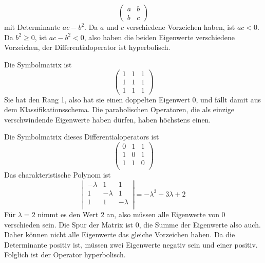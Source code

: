 \begin{loesung}
\begin{teilaufgaben}
\[
\begin{pmatrix}a&b\\b&c\end{pmatrix}
\]
mit Determinante $ac-b^2$. Da $a$ und $c$ verschiedene Vorzeichen
haben, ist $ac< 0$. Da $b^2\ge 0$, ist $ac-b^2<0$, also haben
die beiden Eigenwerte verschiedene Vorzeichen, der Differentialoperator
ist hyperbolisch.
\item Die Symbolmatrix ist
\[
\begin{pmatrix}1&1&1\\1&1&1\\1&1&1\end{pmatrix}
\]
Sie hat den Rang 1, also hat sie einen doppelten Eigenwert $0$,
und fällt damit aus dem Klassifikationsschema. Die parabolischen
Operatoren, die als einzige verschwindende Eigenwerte haben dürfen,
haben höchstens einen.
\item Die Symbolmatrix dieses Differentialoperators ist
\[
\begin{pmatrix}
0&1&1\\
1&0&1\\
1&1&0\\
\end{pmatrix}
\]
Das charakteristische Polynom ist
\[
\left|\,
\begin{matrix}
-\lambda&1&1\\
1&-\lambda&1\\
1&1&-\lambda\\
\end{matrix}
\,\right|
=-\lambda^3+3\lambda+2
\]
Für $\lambda=2$ nimmt es den Wert $2$ an, also müssen alle Eigenwerte
von $0$ verschieden sein. Die Spur der Matrix ist $0$, die Summe der
Eigenwerte also auch. Daher können nicht alle Eigenwerte das gleiche
Vorzeichen haben. Da die Determinante positiv ist, müssen zwei Eigenwerte
negativ sein und einer positiv. Folglich ist der Operator hyperbolisch.
\end{teilaufgaben}
\end{loesung}
